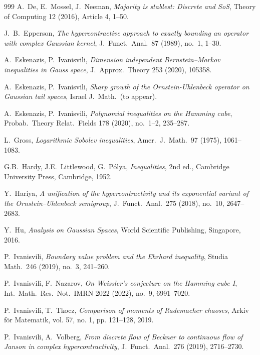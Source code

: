 \documentclass[9pt, a4paper]{amsart}
\newcommand{\1}{{\chi_{}}}%
\numberwithin{equation}{section}
\begin{document}
\begin{thebibliography}{999}
{\sc A.~De, E.~Mossel, J.~Neeman}, 
{\em Majority is stablest: Discrete and SoS}, 
Theory of Computing 12 (2016), Article 4, 1--50.

{\sc J.~B.~Epperson}, 
{\em The hypercontractive approach to exactly bounding an operator with complex Gaussian kernel}, 
J.\ Funct.\ Anal.\ 87 (1989), no.~1, 1--30.

{\sc A.~Eskenazis, P.~Ivanisvili}, 
{\em Dimension independent Bernstein--Markov inequalities in Gauss space}, 
J.\ Approx.\ Theory 253 (2020), 105358.

{\sc A.~Eskenazis, P.~Ivanisvili}, 
{\em Sharp growth of the Ornstein-Uhlenbeck operator on Gaussian tail spaces}, 
Israel J.\ Math.\ (to appear).

{\sc A.~Eskenazis, P.~Ivanisvili}, 
{\em Polynomial inequalities on the Hamming cube}, 
Probab.\ Theory Relat.\ Fields 178 (2020), no.~1--2, 235--287.

{\sc L.~Gross}, 
{\em Logarithmic Sobolev inequalities}, 
Amer.\ J.\ Math.\ 97 (1975), 1061--1083.

{\sc G.B.~Hardy, J.E.~Littlewood, G.~P\'olya}, 
{\em Inequalities}, 
2nd ed., Cambridge University Press, Cambridge, 1952.

{\sc Y.~Hariya}, 
{\em A unification of the hypercontractivity and its exponential variant of the Ornstein--Uhlenbeck semigroup}, 
J.\ Funct.\ Anal.\ 275 (2018), no.~10, 2647--2683.

{\sc Y.~Hu}, 
{\em Analysis on Gaussian Spaces}, 
World Scientific Publishing, Singapore, 2016.

{\sc P.~Ivanisvili}, 
{\em Boundary value problem and the Ehrhard inequality}, 
Studia Math.\ 246 (2019), no.~3, 241--260.

{\sc P.~Ivanisvili, F.~Nazarov}, 
{\em On Weissler's conjecture on the Hamming cube I}, 
Int.\ Math.\ Res.\ Not.\ IMRN 2022 (2022), no.~9, 6991--7020.

{\sc P.~Ivanisvili, T.~Tkocz}, 
{\em Comparison of moments of Rademacher chaoses}, 
 Arkiv f\"or Matematik, vol. 57, no. 1, pp. 121--128, 2019.

{\sc P.~Ivanisvili, A.~Volberg}, 
{\em From discrete flow of Beckner to continuous flow of Janson in complex hypercontractivity}, 
J.\ Funct.\ Anal.\ 276 (2019), 2716--2730.


\end{thebibliography}
\end{document}
